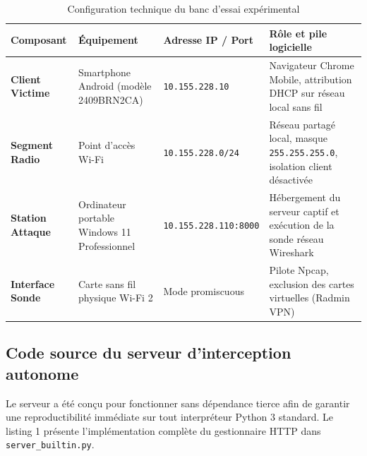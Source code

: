 \documentclass[a4paper,11pt]{article}
\begin{document}
\begin{table}[htbp]
\centering
\small
\caption{Configuration technique du banc d'essai expérimental}
\begin{tabularx}{\textwidth}{l p{3.2cm} p{3.0cm} X}
\toprule
\textbf{Composant} & \textbf{Équipement} & \textbf{Adresse IP / Port} & \textbf{Rôle et pile logicielle} \\
\midrule
\textbf{Client Victime} & Smartphone Android (modèle 2409BRN2CA) & \texttt{10.155.228.10} & Navigateur Chrome Mobile, attribution DHCP sur réseau local sans fil \\
\textbf{Segment Radio} & Point d'accès Wi-Fi & \texttt{10.155.228.0/24} & Réseau partagé local, masque \texttt{255.255.255.0}, isolation client désactivée \\
\textbf{Station Attaque} & Ordinateur portable Windows 11 Professionnel & \texttt{10.155.228.110:8000} & Hébergement du serveur captif et exécution de la sonde réseau Wireshark \\
\textbf{Interface Sonde} & Carte sans fil physique Wi-Fi 2 & Mode promiscuous & Pilote Npcap, exclusion des cartes virtuelles (Radmin VPN) \\
\bottomrule
\end{tabularx}
\end{table}

\subsection{Code source du serveur d'interception autonome}
Le serveur a été conçu pour fonctionner sans dépendance tierce afin de garantir une reproductibilité immédiate sur tout interpréteur Python 3 standard. Le listing 1 présente l'implémentation complète du gestionnaire HTTP dans \texttt{server\_builtin.py}.
\end{document}
